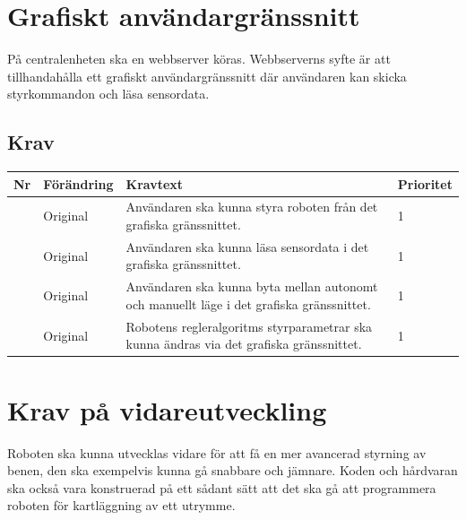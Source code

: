 \documentclass[a4paper,titlepage,12pt]{article}
\newcounter{reqNr}
\newcommand{\nextReqNr}{\stepcounter{reqNr}\arabic{reqNr}}
\begin{document}
    \section{Grafiskt användargränssnitt}
    På centralenheten ska en webbserver köras. Webbserverns syfte är att
    tillhandahålla ett grafiskt användargränssnitt där användaren kan skicka
    styrkommandon och läsa sensordata.
	\subsection{Krav}
	\begin{longtable}[c]{ c l>{\raggedright}p{} l }
		\textbf{Nr} & \textbf{Förändring} & \textbf{Kravtext} & \textbf{Prioritet} 
		\\ \midrule

		\nextReqNr{} & Original & Användaren ska kunna styra roboten från
								  det grafiska gränssnittet. & 1
		\\ \midrule

		\nextReqNr{} & Original & Användaren ska kunna läsa sensordata i det grafiska gränssnittet. & 1
		
		\\ \midrule

		\nextReqNr{} & Original & Användaren ska kunna byta
		mellan autonomt och manuellt läge i det grafiska gränssnittet. & 1
		\\ \midrule

		\nextReqNr{} & Original & Robotens regleralgoritms styrparametrar
		ska kunna ändras via det grafiska gränssnittet. & 1
		\\ \midrule

	\end{longtable}

	\section{Krav på vidareutveckling}
	Roboten ska kunna utvecklas vidare för att få en mer avancerad styrning av benen, 
	den ska exempelvis kunna gå snabbare och jämnare. Koden och hårdvaran ska också vara
	konstruerad på ett sådant sätt att det ska gå att programmera roboten för
	kartläggning av ett utrymme.
\end{document}
